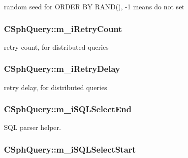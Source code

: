 random seed for O\-R\-D\-E\-R B\-Y R\-A\-N\-D(), -\/1 means do not set 

\hypertarget{classCSphQuery_afe77175090de03ece5fcfe69053aed07}{
\subsubsection[{m\-\_\-i\-Retry\-Count}]{ C\-Sph\-Query\-::m\-\_\-i\-Retry\-Count}}\label{classCSphQuery_afe77175090de03ece5fcfe69053aed07}


retry count, for distributed queries 

\hypertarget{classCSphQuery_adb2b972d9fc1a92333e878625c9fc6c7}{
\subsubsection[{m\-\_\-i\-Retry\-Delay}]{ C\-Sph\-Query\-::m\-\_\-i\-Retry\-Delay}}\label{classCSphQuery_adb2b972d9fc1a92333e878625c9fc6c7}


retry delay, for distributed queries 

\hypertarget{classCSphQuery_a61f3b213ff219c4fdd8fd548a4401790}{
\subsubsection[{m\-\_\-i\-S\-Q\-L\-Select\-End}]{ C\-Sph\-Query\-::m\-\_\-i\-S\-Q\-L\-Select\-End}}\label{classCSphQuery_a61f3b213ff219c4fdd8fd548a4401790}


S\-Q\-L parser helper. 

\hypertarget{classCSphQuery_a64b893fbd1975d6ebce6bf7baa8471fa}{
\subsubsection[{m\-\_\-i\-S\-Q\-L\-Select\-Start}]{ C\-Sph\-Query\-::m\-\_\-i\-S\-Q\-L\-Select\-Start}}\label{classCSphQuery_a64b893fbd1975d6ebce6bf7baa8471fa}



